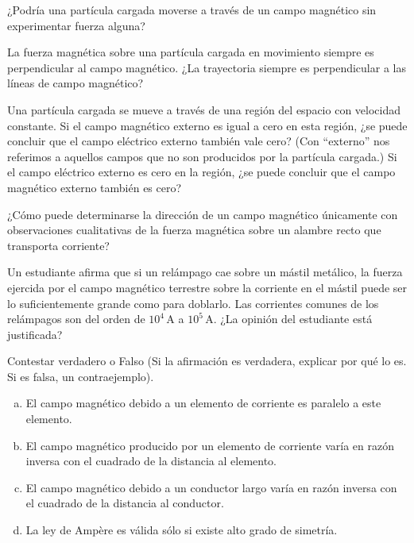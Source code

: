 %
\begin{Exercise}
    ¿Podría una partícula cargada moverse a través de un campo magnético sin experimentar fuerza alguna?
\end{Exercise}
%
\begin{Exercise}
    La fuerza magnética sobre una partícula cargada en movimiento siempre es perpendicular al campo magnético. ¿La trayectoria siempre es perpendicular a las líneas de campo magnético?
\end{Exercise}
%
\begin{Exercise}
    Una partícula cargada se mueve a través de una región del espacio con velocidad constante. Si el campo magnético externo es igual a cero en esta región, ¿se puede concluir que el campo eléctrico externo también vale cero? (Con ``externo'' nos referimos a aquellos campos que no son producidos por la partícula cargada.) Si el campo eléctrico externo es cero en la región, ¿se puede concluir que el campo magnético externo también es cero?
\end{Exercise}
%
\begin{Exercise}
    ¿Cómo puede determinarse la dirección de un campo magnético únicamente con observaciones cualitativas de la fuerza magnética sobre un alambre recto que transporta corriente?
\end{Exercise}
%
\begin{Exercise}
    Un estudiante afirma que si un relámpago cae sobre un mástil metálico, la fuerza ejercida por el campo magnético terrestre sobre la corriente en el mástil puede ser lo suficientemente grande como para doblarlo. Las corrientes comunes de los relámpagos son del orden de $10^4\,\text{A}$ a $10^5\,\text{A}$. ¿La opinión del estudiante está justificada?
\end{Exercise}
%
\begin{Exercise}
    Contestar verdadero o Falso (Si la afirmación es verdadera, explicar por qué lo es. Si es falsa, un contraejemplo).
    \begin{enumerate}[a)]
        \item El campo magnético debido a un elemento de corriente es paralelo a este elemento.
        \item El campo magnético producido por un elemento de corriente varía en razón inversa con el cuadrado de la distancia al elemento.
        \item El campo magnético debido a un conductor largo varía en razón inversa con el cuadrado de la distancia al conductor.
        \item La ley de Amp\`ere es válida sólo si existe alto grado de simetría.
    \end{enumerate}
\end{Exercise}
